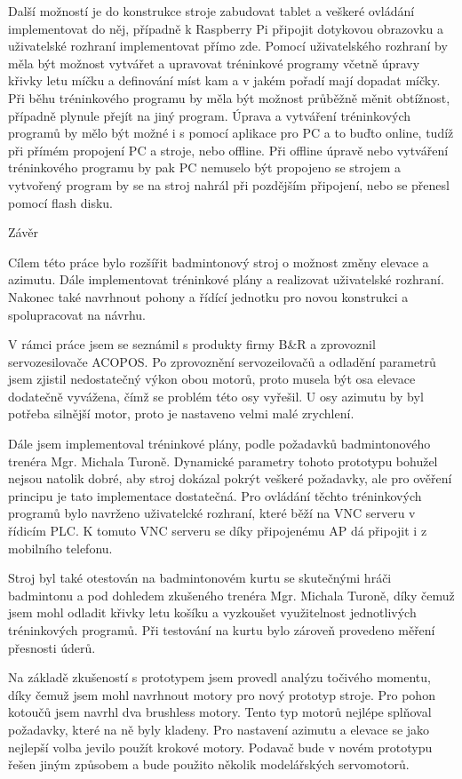 Další možností je do konstrukce stroje zabudovat tablet a veškeré ovládání implementovat do něj, případně k Raspberry Pi připojit dotykovou obrazovku a uživatelské rozhraní implementovat přímo zde.
\nl
\nl
Pomocí uživatelského rozhraní by měla být možnost vytvářet a upravovat tréninkové programy včetně úpravy křivky letu míčku a definování míst kam a v jakém pořadí mají dopadat míčky. Při běhu tréninkového programu by měla být možnost průběžně měnit obtížnost, případně plynule přejít na jiný program. 
\nl
\nl
Úprava a vytváření tréninkových programů by mělo být možné i s pomocí aplikace pro PC a to buďto online, tudíž při přímém propojení PC a stroje, nebo offline. Při offline úpravě nebo vytváření tréninkového programu by pak PC nemuselo být propojeno se strojem a vytvořený program by se na stroj nahrál při pozdějším připojení, nebo se přenesl pomocí flash disku. 


\chap Závěr

Cílem této práce bylo rozšířit badmintonový stroj o možnost změny elevace a azimutu. Dále implementovat tréninkové plány a realizovat uživatelské rozhraní. Nakonec také navrhnout pohony a řídící jednotku pro novou konstrukci a spolupracovat na návrhu.

V rámci práce jsem se seznámil s produkty firmy B\&R a zprovoznil servozesilovače ACOPOS. Po zprovoznění servozeilovačů a odladění parametrů jsem zjistil nedostatečný výkon obou motorů, proto musela být osa elevace dodatečně vyvážena, čímž se problém této osy vyřešil. U osy azimutu by byl potřeba silnější motor, proto je nastaveno velmi malé zrychlení. 

Dále jsem implementoval tréninkové plány, podle požadavků badmintonového trenéra Mgr. Michala Turoně. Dynamické parametry tohoto prototypu bohužel nejsou natolik dobré, aby stroj dokázal pokrýt veškeré požadavky, ale pro ověření principu je tato implementace dostatečná. Pro ovládání těchto tréninkových programů bylo navrženo uživatelcké rozhraní, které běží na VNC serveru v řídicím PLC. K tomuto VNC serveru se díky připojenému AP dá připojit i z mobilního telefonu. 

Stroj byl také otestován na badmintonovém kurtu se skutečnými hráči badmintonu a pod dohledem zkušeného trenéra Mgr. Michala Turoně, díky čemuž jsem mohl odladit křivky letu košíku a vyzkoušet využitelnost jednotlivých tréninkových programů. Při testování na kurtu bylo zároveň provedeno měření přesnosti úderů.

Na základě zkušeností s prototypem jsem provedl analýzu točivého momentu, díky čemuž jsem mohl navrhnout motory pro nový prototyp stroje. Pro pohon kotoučů jsem navrhl dva brushless motory. Tento typ motorů nejlépe splňoval požadavky, které na ně byly kladeny. Pro nastavení azimutu a elevace se jako nejlepší volba jevilo použít krokové motory. Podavač bude v novém prototypu řešen jiným způsobem a bude použito několik modelářských servomotorů.

